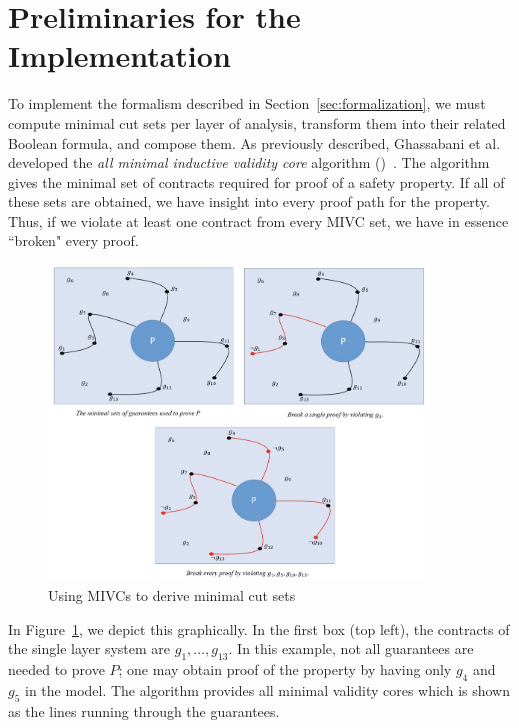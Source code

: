 \section{Preliminaries for the Implementation}
\label{sec:prelim}

%
To implement the formalism described in Section~\ref{sec:formalization}, we must compute minimal cut sets per layer of analysis, transform them into their related Boolean formula, and compose them. As previously described, Ghassabani et al. developed the \textit{all minimal inductive validity core} algorithm (\aivcalg)~\cite{GhassabaniGW16,Ghassabani2017EfficientGO}. The \aivcalg algorithm gives the minimal set of contracts required for proof of a safety property. If all of these sets are obtained, we have insight into every proof path for the property. Thus, if we violate at least one contract from every MIVC set, we have in essence ``broken" every proof. 
\begin{figure}[h!]
	\begin{center}
		\includegraphics[width=0.9\textwidth]{images/mivcBreaking.png}
	\end{center}
	\caption{Using MIVCs to derive minimal cut sets}
	\label{fig:mivcBreaking}
\end{figure}

In Figure~\ref{fig:mivcBreaking}, we depict this graphically. In the first box (top left), the contracts of the single layer system are $g_1, \dots, g_{13}$. In this example, not all guarantees are needed to prove $P$; one may obtain proof of the property by having only $g_4$ and $g_5$ in the model. The \aivcalg algorithm provides all minimal validity cores which is shown as the lines running through the guarantees. 

